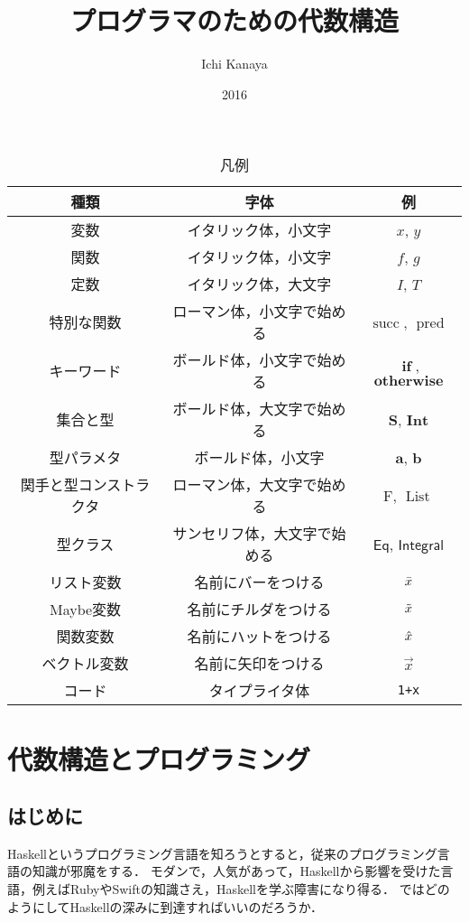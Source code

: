 \documentclass[twocolumn]{jsbook}
\title{プログラマのための代数構造}
\author{Ichi Kanaya}
\date{2016}
\newcommand{\hsklType}[1]{\textbf{#1}}
\newcommand{\hsklTypeclass}[1]{\mathsf{#1}}
\newcommand{\hsklTypeConstructor}[1]{\mathop{\mathrm{#1}}}
\DeclareMathOperator{\hsklListConstructor}{\hsklTypeConstructor{List}}
\DeclareMathOperator{\hsklPred}{pred}
\DeclareMathOperator{\hsklSucc}{succ}
\newcommand{\hsklInt}{\hsklType{Int}}
\newcommand{\hsklIntegral}{\hsklTypeclass{Integral}}
\newcommand{\hsklEq}{\hsklTypeclass{Eq}}
\newcommand{\hsklFunction}[1]{\Hat{#1}}
\newcommand{\hsklList}[1]{\Bar{#1}}
\newcommand{\hsklMaybe}[1]{\Tilde{#1}}
\newcommand{\mathKeyword}[1]{\mathbf{#1}}
\DeclareMathOperator{\mathIf}{\mathKeyword{if}}
\newcommand{\mathOtherwise}{\mathKeyword{otherwise}}
\newcommand{\mathFunctor}[1]{\mathrm{#1}}
\newcommand{\mathSet}[1]{\mathbf{#1}}
\newcommand{\mathVector}[1]{\vec{#1}}
\begin{document}
\maketitle
\tableofcontents

\begin{table*}
\caption{凡例}
\begin{center}
\begin{tabular}{||c|c|c||}
\hline
種類&字体&例\\
\hline
変数&イタリック体，小文字&$x$, $y$\\
関数&イタリック体，小文字&$f$, $g$\\
定数&イタリック体，大文字&$I$, $T$\\
特別な関数&ローマン体，小文字で始める&$\hsklSucc$, $\hsklPred$\\
キーワード&ボールド体，小文字で始める&$\mathIf$, $\mathOtherwise$\\
集合と型&ボールド体，大文字で始める&$\mathSet{S}$, $\hsklInt$\\
型パラメタ&ボールド体，小文字&$\hsklType{a}$, $\hsklType{b}$\\
関手と型コンストラクタ&ローマン体，大文字で始める&$\mathFunctor{F}$, $\hsklListConstructor$\\
型クラス&サンセリフ体，大文字で始める&$\hsklEq$, $\hsklIntegral$\\
\hline
リスト変数&名前にバーをつける&$\hsklList{x}$\\
Maybe変数&名前にチルダをつける&$\hsklMaybe{x}$\\
関数変数&名前にハットをつける&$\hsklFunction{x}$\\
ベクトル変数&名前に矢印をつける&$\mathVector{x}$\\
\hline
コード&タイプライタ体&\texttt{1+x}\\
\hline
\end{tabular}
\end{center}
\end{table*}


\part{代数構造とプログラミング}

\chapter{はじめに}

Haskellというプログラミング言語を知ろうとすると，従来のプログラミング言語の知識が邪魔をする．
モダンで，人気があって，Haskellから影響を受けた言語，例えばRubyやSwiftの知識さえ，Haskellを学ぶ障害になり得る．
ではどのようにしてHaskellの深みに到達すればいいのだろうか．
\end{document}
